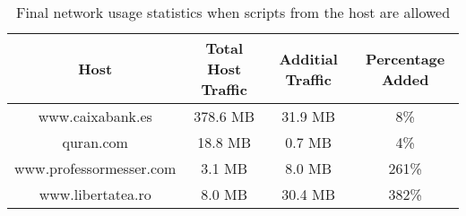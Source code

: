 \begin{table}[h]
\begin{center}
\begin{tabular}{| c c c c |}
	\hline
	Host & Total Host Traffic & Additial Traffic & Percentage Added \\ \hline
	www.caixabank.es        & 378.6 MB & 31.9 MB &   8\% \\ \hline
	quran.com               &  18.8 MB &  0.7 MB &   4\% \\ \hline
	www.professormesser.com &   3.1 MB &  8.0 MB & 261\% \\ \hline
	www.libertatea.ro       &   8.0 MB & 30.4 MB & 382\% \\ \hline
\end{tabular}
\end{center}
	\caption{Final network usage statistics when scripts from the host are allowed}
\label{tab:percentageBypass}
\end{table}

